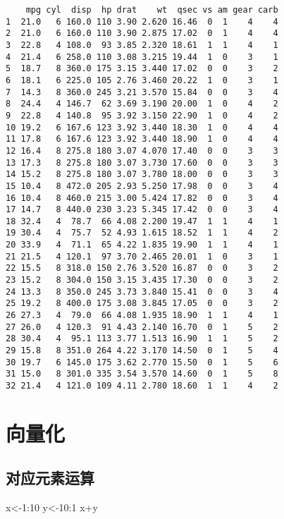 \documentclass[
  letterpaper,
  DIV=11,
  numbers=noendperiod]{scrreprt}
\newenvironment{Shaded}{\begin{snugshade}}{\end{snugshade}}
\newcommand{\DecValTok}[1]{\textcolor[rgb]{0.68,0.00,0.00}{#1}}
\newcommand{\NormalTok}[1]{\textcolor[rgb]{0.00,0.23,0.31}{#1}}
\newcommand{\OtherTok}[1]{\textcolor[rgb]{0.00,0.23,0.31}{#1}}
\newcommand{\SpecialCharTok}[1]{\textcolor[rgb]{0.37,0.37,0.37}{#1}}
\begin{document}
\begin{verbatim}
    mpg cyl  disp  hp drat    wt  qsec vs am gear carb
1  21.0   6 160.0 110 3.90 2.620 16.46  0  1    4    4
2  21.0   6 160.0 110 3.90 2.875 17.02  0  1    4    4
3  22.8   4 108.0  93 3.85 2.320 18.61  1  1    4    1
4  21.4   6 258.0 110 3.08 3.215 19.44  1  0    3    1
5  18.7   8 360.0 175 3.15 3.440 17.02  0  0    3    2
6  18.1   6 225.0 105 2.76 3.460 20.22  1  0    3    1
7  14.3   8 360.0 245 3.21 3.570 15.84  0  0    3    4
8  24.4   4 146.7  62 3.69 3.190 20.00  1  0    4    2
9  22.8   4 140.8  95 3.92 3.150 22.90  1  0    4    2
10 19.2   6 167.6 123 3.92 3.440 18.30  1  0    4    4
11 17.8   6 167.6 123 3.92 3.440 18.90  1  0    4    4
12 16.4   8 275.8 180 3.07 4.070 17.40  0  0    3    3
13 17.3   8 275.8 180 3.07 3.730 17.60  0  0    3    3
14 15.2   8 275.8 180 3.07 3.780 18.00  0  0    3    3
15 10.4   8 472.0 205 2.93 5.250 17.98  0  0    3    4
16 10.4   8 460.0 215 3.00 5.424 17.82  0  0    3    4
17 14.7   8 440.0 230 3.23 5.345 17.42  0  0    3    4
18 32.4   4  78.7  66 4.08 2.200 19.47  1  1    4    1
19 30.4   4  75.7  52 4.93 1.615 18.52  1  1    4    2
20 33.9   4  71.1  65 4.22 1.835 19.90  1  1    4    1
21 21.5   4 120.1  97 3.70 2.465 20.01  1  0    3    1
22 15.5   8 318.0 150 2.76 3.520 16.87  0  0    3    2
23 15.2   8 304.0 150 3.15 3.435 17.30  0  0    3    2
24 13.3   8 350.0 245 3.73 3.840 15.41  0  0    3    4
25 19.2   8 400.0 175 3.08 3.845 17.05  0  0    3    2
26 27.3   4  79.0  66 4.08 1.935 18.90  1  1    4    1
27 26.0   4 120.3  91 4.43 2.140 16.70  0  1    5    2
28 30.4   4  95.1 113 3.77 1.513 16.90  1  1    5    2
29 15.8   8 351.0 264 4.22 3.170 14.50  0  1    5    4
30 19.7   6 145.0 175 3.62 2.770 15.50  0  1    5    6
31 15.0   8 301.0 335 3.54 3.570 14.60  0  1    5    8
32 21.4   4 121.0 109 4.11 2.780 18.60  1  1    4    2
\end{verbatim}

\chapter{向量化}\label{ux5411ux91cfux5316}

\section{对应元素运算}\label{ux5bf9ux5e94ux5143ux7d20ux8fd0ux7b97}

\begin{Shaded}
\begin{Highlighting}[]
\NormalTok{x}\OtherTok{\textless{}{-}}\DecValTok{1}\SpecialCharTok{:}\DecValTok{10}
\NormalTok{y}\OtherTok{\textless{}{-}}\DecValTok{10}\SpecialCharTok{:}\DecValTok{1}
\NormalTok{x}\SpecialCharTok{+}\NormalTok{y}
\end{Highlighting}
\end{Shaded}
\end{document}
